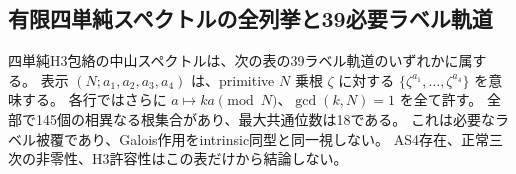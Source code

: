 \subsection{有限四単純スペクトルの全列挙と39必要ラベル軌道}
\label{subsec:cubic-four-simple-finite-atlas}
\begin{theorem}[39 Galoisラベル軌道による全必要被覆]
\label{thm:cubic-four-simple-finite-atlas}
四単純H3包絡の中山スペクトルは、次の表の39ラベル軌道のいずれかに属する。
表示 $(N;a_1,a_2,a_3,a_4)$ は、primitive $N$ 乗根 $\zeta$ に対する
$\{\zeta^{a_1},\ldots,\zeta^{a_4}\}$ を意味する。
各行ではさらに $a\mapsto ka\pmod N$、$\gcd(k,N)=1$ を全て許す。
全部で145個の相異なる根集合があり、最大共通位数は18である。
これは必要なラベル被覆であり、Galois作用をintrinsic同型と同一視しない。
AS4存在、正常三次の非零性、H3許容性はこの表だけから結論しない。
\end{theorem}
